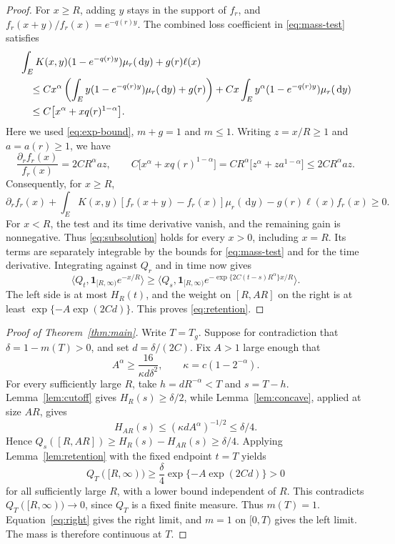 \documentclass[11pt]{article}
\newcommand{\pair}[2]{\langle #1,#2\rangle}
\newcommand{\ind}{\mathbf{1}}
\newcommand{\dd}{\,\mathrm{d}}
\begin{document}
\begin{proof}
For $x\ge R$, adding $y$ stays in the support of $f_r$, and $f_r(x+y)/f_r(x)=e^{-q(r)y}$. The combined loss coefficient in \eqref{eq:mass-test} satisfies
\begin{align}
 &\int_E K(x,y)(1-e^{-q(r)y})\mu_r(\dd y)+g(r)\ell(x)\notag\\
 &\quad\le Cx^\alpha\left(\int_E y(1-e^{-q(r)y})\mu_r(\dd y)+g(r)\right)
       +Cx\int_E y^\alpha(1-e^{-q(r)y})\mu_r(\dd y)\notag\\
 &\quad\le C\bigl[x^\alpha+xq(r)^{1-\alpha}\bigr].\label{eq:loss}
\end{align}
Here we used \eqref{eq:exp-bound}, $m+g=1$ and $m\le1$. Writing $z=x/R\ge1$ and $a=a(r)\ge1$, we have
\[
 \frac{\partial_r f_r(x)}{f_r(x)}=2CR^\alpha az,
 \qquad C\bigl[x^\alpha+xq(r)^{1-\alpha}\bigr]
 =CR^\alpha\bigl[z^\alpha+za^{1-\alpha}\bigr]\le2CR^\alpha az.
\]
Consequently, for $x\ge R$,
\begin{equation}\label{eq:subsolution}
 \partial_r f_r(x)+\int_E K(x,y)[f_r(x+y)-f_r(x)]\mu_r(\dd y)
       -g(r)\ell(x)f_r(x)\ge0.
\end{equation}
For $x<R$, the test and its time derivative vanish, and the remaining gain is nonnegative. Thus \eqref{eq:subsolution} holds for every $x>0$, including $x=R$. Its terms are separately integrable by the bounds for \eqref{eq:mass-test} and for the time derivative. Integrating against $Q_r$ and in time now gives
\[
 \pair{Q_t}{\ind_{[R,\infty)}e^{-x/R}}
 \ge\pair{Q_s}{\ind_{[R,\infty)}
                 e^{-\exp\{2C(t-s)R^\alpha\}x/R}}.
\]
The left side is at most $H_R(t)$, and the weight on $[R,AR]$ on the right is at least $\exp\{-A\exp(2Cd)\}$. This proves \eqref{eq:retention}.
\end{proof}

\begin{proof}[Proof of Theorem~\ref{thm:main}]
Write $T=T_g$. Suppose for contradiction that $\delta=1-m(T)>0$, and set $d=\delta/(2C)$. Fix $A>1$ large enough that
\[
 A^\alpha\ge\frac{16}{\kappa d\delta^2},
 \qquad \kappa=c(1-2^{-\alpha}).
\]
For every sufficiently large $R$, take $h=dR^{-\alpha}<T$ and $s=T-h$. Lemma~\ref{lem:cutoff} gives $H_R(s)\ge\delta/2$, while Lemma~\ref{lem:concave}, applied at size $AR$, gives
\[
 H_{AR}(s)\le(\kappa dA^\alpha)^{-1/2}\le\delta/4.
\]
Hence $Q_s([R,AR])\ge H_R(s)-H_{AR}(s)\ge\delta/4$. Applying Lemma~\ref{lem:retention} with the fixed endpoint $t=T$ yields
\[
 Q_T([R,\infty))\ge\frac\delta4\exp\{-A\exp(2Cd)\}>0
\]
for all sufficiently large $R$, with a lower bound independent of $R$. This contradicts $Q_T([R,\infty))\to0$, since $Q_T$ is a fixed finite measure. Thus $m(T)=1$. Equation~\eqref{eq:right} gives the right limit, and $m=1$ on $[0,T)$ gives the left limit. The mass is therefore continuous at $T$.
\end{proof}
\end{document}
